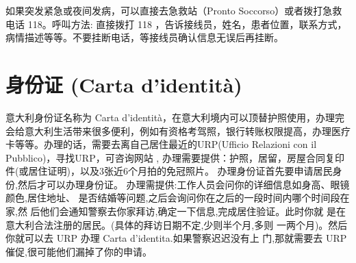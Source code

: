 如果突发紧急或夜间发病，可以直接去急救站（Pronto Soccorso）或者拨打急救电话 118。呼叫方法: 直接拨打 118 ，告诉接线员，姓名，患者位置，联系方式，病情描述等等。不要挂断电话，等接线员确认信息无误后再挂断。

\section{身份证 (Carta d'identità)}
意大利身份证名称为 Carta d'identità，在意大利境内可以顶替护照使用，办理完会给意大利生活带来很多便利，例如有资格考驾照，银行转账权限提高，办理医疗卡等等。办理的话，需要去离自己居住最近的URP(Ufficio Relazioni con il Pubblico)，寻找URP，可咨询网站 \cite{cid}, 办理需要提供：护照，居留，房屋合同复印件(或居住证明)，以及3张近6个月拍的免冠照片。
办理身份证首先要申请居民身份,然后才可以办理身份证。 办理需提供:工作人员会问你的详细信息如身高、眼镜颜色,居住地址、 是否结婚等问题,之后会询问你在之后的一段时间内哪个时间段在家,然 后他们会通知警察去你家拜访,确定一下信息,完成居住验证。此时你就 是在意大利合法注册的居民。(具体的拜访日期不定,少则半个月,多则 一两个月)。然后你就可以去 URP 办理 Carta d’identita.如果警察迟迟没有上 门,那就需要去 URP 催促,很可能他们漏掉了你的申请。
